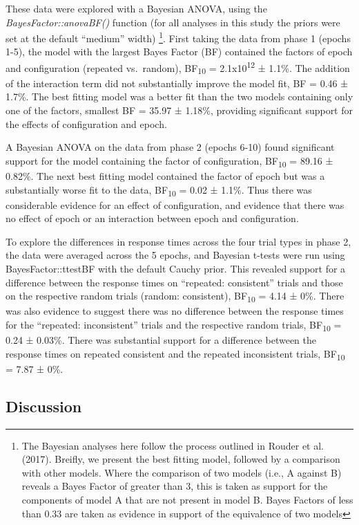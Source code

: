 \documentclass[
  man,floatsintext]{apa7}
\begin{document}
These data were explored with a Bayesian ANOVA, using the \emph{BayesFactor::anovaBF()} function (for all analyses in this study the priors were set at the default ``medium'' width) \footnote{The Bayesian analyses here follow the process outlined in Rouder et al. (2017). Breifly, we present the best fitting model, followed by a comparison with other models. Where the comparison of two models (i.e., A against B) reveals a Bayes Factor of greater than 3, this is taken as support for the components of model A that are not present in model B. Bayes Factors of less than 0.33 are taken as evidence in support of the equivalence of two models}. First taking the data from phase 1 (epochs 1-5), the model with the largest Bayes Factor (BF) contained the factors of epoch and configuration (repeated vs.~random), BF\textsubscript{10} = 2.1x10\textsuperscript{12} ± 1.1\%. The addition of the interaction term did not substantially improve the model fit, BF = 0.46 ± 1.7\%. The best fitting model was a better fit than the two models containing only one of the factors, smallest BF = 35.97 ± 1.18\%, providing significant support for the effects of configuration and epoch.

A Bayesian ANOVA on the data from phase 2 (epochs 6-10) found significant support for the model containing the factor of configuration, BF\textsubscript{10} = 89.16 ± 0.82\%. The next best fitting model contained the factor of epoch but was a substantially worse fit to the data, BF\textsubscript{10} = 0.02 ± 1.1\%. Thus there was considerable evidence for an effect of configuration, and evidence that there was no effect of epoch or an interaction between epoch and configuration.

To explore the differences in response times across the four trial types in phase 2, the data were averaged across the 5 epochs, and Bayesian t-tests were run using BayesFactor::ttestBF with the default Cauchy prior. This revealed support for a difference between the response times on ``repeated: consistent'' trials and those on the respective random trials (random: consistent), BF\textsubscript{10} = 4.14 ± 0\%. There was also evidence to suggest there was no difference between the response times for the ``repeated: inconsistent'' trials and the respective random trials, BF\textsubscript{10} = 0.24 ± 0.03\%. There was substantial support for a difference between the response times on repeated consistent and the repeated inconsistent trials, BF\textsubscript{10} = 7.87 ± 0\%.

\hypertarget{discussion}{%
\subsection{Discussion}\label{discussion}}
\end{document}
